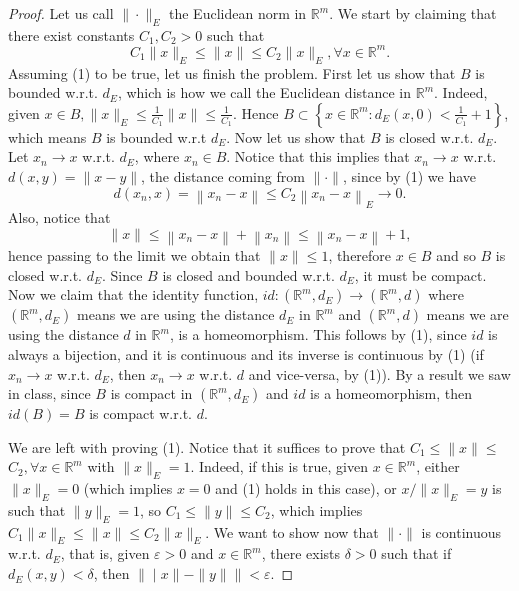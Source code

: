 \documentclass{article}
\begin{document}
\begin{proof}
    Let us call $\|\cdot\|_E$ the Euclidean norm in $\mathbb{R}^m$. We start by claiming that there exist constants $C_1, C_2>0$ such that
$$
C_1\|x\|_E \leq\|x\| \leq C_2\|x\|_E, \forall x \in \mathbb{R}^m .
$$
Assuming (1) to be true, let us finish the problem. First let us show that $B$ is bounded w.r.t. $d_E$, which is how we call the Euclidean distance in $\mathbb{R}^m$. Indeed, given $x \in B,\|x\|_E \leq \frac{1}{C_1}\|x\| \leq \frac{1}{C_1}$. Hence $B \subset\left\{x \in \mathbb{R}^m: d_E(x, 0)<\frac{1}{C_1}+1\right\}$, which means $B$ is bounded w.r.t $d_E$.
Now let us show that $B$ is closed w.r.t. $d_E$. Let $x_n \rightarrow x$ w.r.t. $d_E$, where $x_n \in B$. Notice that this implies that $x_n \rightarrow x$ w.r.t. $d(x, y)=\|x-y\|$, the distance coming from $\|\cdot\|$, since by (1) we have
$$
d\left(x_n, x\right)=\left\|x_n-x\right\| \leq C_2\left\|x_n-x\right\|_E \rightarrow 0 .
$$
Also, notice that
$$
\|x\| \leq\left\|x_n-x\right\|+\left\|x_n\right\| \leq\left\|x_n-x\right\|+1,
$$
hence passing to the limit we obtain that $\|x\| \leq 1$, therefore $x \in B$ and so $B$ is closed w.r.t. $d_E$. Since $B$ is closed and bounded w.r.t. $d_E$, it must be compact. Now we claim that the identity function, $i d:\left(\mathbb{R}^m, d_E\right) \rightarrow\left(\mathbb{R}^m, d\right)$ where $\left(\mathbb{R}^m, d_E\right)$ means we are using the distance $d_E$ in $\mathbb{R}^m$ and $\left(\mathbb{R}^m, d\right)$ means we are using the distance $d$ in $\mathbb{R}^m$, is a homeomorphism. This follows by (1), since $i d$ is always a bijection, and it is continuous and its inverse is continuous by (1) (if $x_n \rightarrow x$ w.r.t. $d_E$, then $x_n \rightarrow x$ w.r.t. $d$ and vice-versa, by (1)). By a result we saw in class, since $B$ is compact in $\left(\mathbb{R}^m, d_E\right)$ and $i d$ is a homeomorphism, then $i d(B)=B$ is compact w.r.t. $d$.

We are left with proving (1). Notice that it suffices to prove that $C_1 \leq\|x\| \leq$ $C_2, \forall x \in \mathbb{R}^m$ with $\|x\|_E=1$. Indeed, if this is true, given $x \in \mathbb{R}^m$, either $\|x\|_E=0$ (which implies $x=0$ and (1) holds in this case), or $x /\|x\|_E=y$ is such that $\|y\|_E=1$, so $C_1 \leq\|y\| \leq C_2$, which implies $C_1\|x\|_E \leq\|x\| \leq C_2\|x\|_E$.
We want to show now that $\|\cdot\|$ is continuous w.r.t. $d_E$, that is, given $\varepsilon>0$ and $x \in \mathbb{R}^m$, there exists $\delta>0$ such that if $d_E(x, y)<\delta$, then $\|\mid x\|-\|y\| \|<\varepsilon$.


\end{proof}
\end{document}
